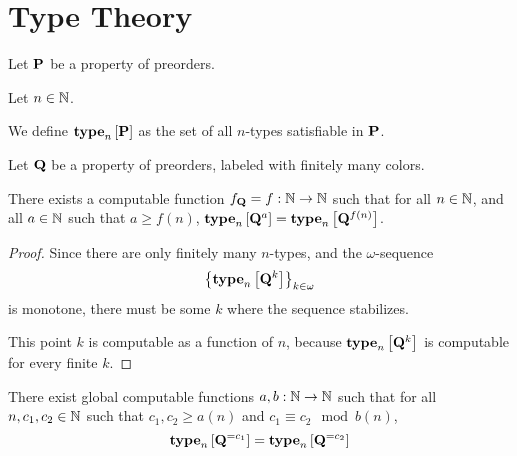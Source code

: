 \section{Type Theory}
\begin{definition}
    Let $\mathbf{P}$ be a property of preorders.

    Let $n \in \mathbb{N}$.

    We define $\mathbf{type}_{n} \left[ {\mathbf{P}} \right]$ as the set of all
    $n$-types satisfiable in $\mathbf{P}$.
\end{definition}

\begin{lemma}\label{f-lemma}
    Let $\mathbf{Q}$ be a property of preorders,
    labeled with finitely many colors.

    There exists a computable function $f_{\mathbf{Q}} = f: \mathbb{N} \to \mathbb{N}$ such that
    for all $n \in \mathbb{N}$, and all $a \in \mathbb{N}$ such that $a \ge f(n)$,
    $\mathbf{type}_{n} \left[ {\mathbf{Q}^{a}} \right] = \mathbf{type}_{n} \left[ {\mathbf{Q}^{f(n)}} \right]$.
\end{lemma}

\begin{proof}
    Since there are only finitely many $n$-types,
    and the $\omega$-sequence \[\left\{ {\mathbf{type}_{n} \left[ {\mathbf{Q}^{k}} \right]} \right\}_{k \in \omega}\]
    is monotone,
    there must be some $k$ where the sequence stabilizes.

    This point $k$ is computable as a function of $n$, because
    $\mathbf{type}_{n} \left[ {\mathbf{Q}^{k}} \right]$ is computable for every finite $k$.
\end{proof}

\begin{lemma}\label{ab-lemma}
    There exist global computable functions $a, b : \mathbb{N} \to \mathbb{N}$ such that
    for all $n, c_1, c_2 \in \mathbb{N}$ such that $c_1, c_2 \ge a(n)$ and $c_1 \equiv c_2 \mod b(n)$,
    \[\mathbf{type}_{n} \left[ {\mathbf{Q}^{= c_1}} \right] = \mathbf{type}_{n} \left[ {\mathbf{Q}^{= c_2}} \right]\]
\end{lemma}

